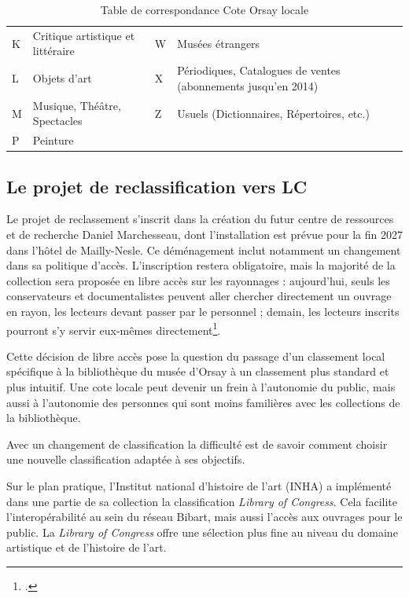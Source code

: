 \begin{table}[htbp]
\begin{tabular}{@{}p{}p{}p{}p{}@{}}
K      & Critique artistique et littéraire              & W       & Musées étrangers \\
L      & Objets d'art                                   & X       & Périodiques, Catalogues de ventes (abonnements jusqu'en 2014) \\
M      & Musique, Théâtre, Spectacles                   & Z       & Usuels (Dictionnaires, Répertoires, etc.) \\
P      & Peinture                                       &         & \\
\bottomrule
\end{tabular}
\caption{Table de correspondance Cote Orsay locale}
\label{tab:cote-orsay}
\end{table}

\subsection{Le projet de reclassification vers LC}

Le projet de reclassement s'inscrit dans la création du futur centre de ressources et de recherche Daniel Marchesseau, dont l'installation est prévue pour la fin 2027 dans l'hôtel de Mailly-Nesle. Ce déménagement inclut notamment un changement dans sa politique d'accès. L'inscription restera obligatoire, mais la majorité de la collection sera proposée en libre accès sur les rayonnages : aujourd'hui, seuls les conservateurs et documentalistes peuvent aller chercher directement un ouvrage en rayon, les lecteurs devant passer par le personnel ; demain, les lecteurs inscrits pourront s'y servir eux-mêmes directement\footcite{cadrageprojet}.

Cette décision de libre accès pose la question du passage d'un classement local spécifique à la bibliothèque du musée d'Orsay à un classement plus standard et plus intuitif. Une cote locale peut devenir un frein à l'autonomie du public, mais aussi à l'autonomie des personnes qui sont moins familières avec les collections de la bibliothèque.

Avec un changement de classification la difficulté est de savoir comment choisir une nouvelle classification adaptée à ses objectifs. 

Sur le plan pratique, l'Institut national d'histoire de l'art (INHA) a implémenté dans une partie de sa collection la classification \textit{Library of Congress}. Cela facilite l'interopérabilité au sein du réseau Bibart, mais aussi l'accès aux ouvrages pour le public. La \textit{Library of Congress}  offre une sélection plus fine au niveau du domaine artistique et de l'histoire de l'art. 


